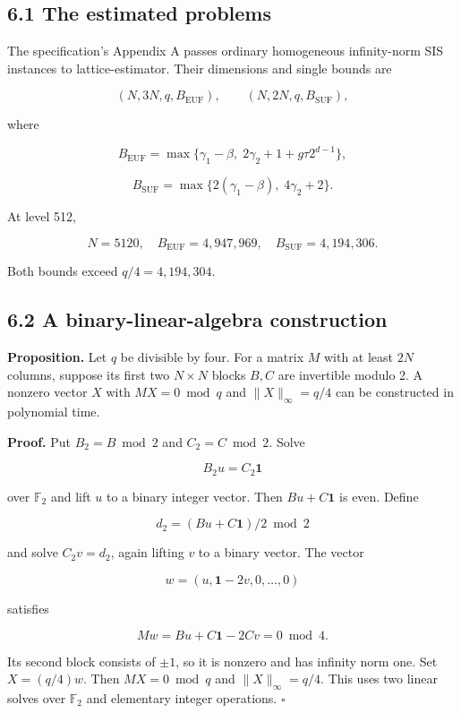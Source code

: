 \documentclass[
  american,
  10pt,
  a4paper,
]{article}
\begin{document}
\subsection{6.1 The estimated problems}\label{the-estimated-problems}

The specification's Appendix A passes ordinary homogeneous infinity-norm
SIS instances to lattice-estimator. Their dimensions and single bounds
are

\[
(N,3N,q,B_{\mathrm{EUF}}),\qquad (N,2N,q,B_{\mathrm{SUF}}),
\]

where

\[
B_{\mathrm{EUF}}=\max\{\gamma_1-\beta,\;2\gamma_2+1+g\tau 2^{d-1}\},
\]

\[
B_{\mathrm{SUF}}=\max\{2(\gamma_1-\beta),\;4\gamma_2+2\}.
\]

At level 512,

\[
N=5120,\quad B_{\mathrm{EUF}}=4,947,969,\quad
B_{\mathrm{SUF}}=4,194,306.
\]

Both bounds exceed \(q/4=4,194,304\).

\subsection{6.2 A binary-linear-algebra
construction}\label{a-binary-linear-algebra-construction}

\textbf{Proposition.} Let \(q\) be divisible by four. For a matrix \(M\)
with at least \(2N\) columns, suppose its first two \(N\times N\) blocks
\(B,C\) are invertible modulo 2. A nonzero vector \(X\) with
\(MX=0\bmod q\) and \(\|X\|_\infty=q/4\) can be constructed in
polynomial time.

\textbf{Proof.} Put \(B_2=B\bmod2\) and \(C_2=C\bmod2\). Solve

\[
B_2u=C_2\mathbf 1
\]

over \(\mathbb F_2\) and lift \(u\) to a binary integer vector. Then
\(Bu+C\mathbf1\) is even. Define

\[
d_2=(Bu+C\mathbf1)/2\bmod2
\]

and solve \(C_2v=d_2\), again lifting \(v\) to a binary vector. The
vector

\[
w=(u,\mathbf1-2v,0,\ldots,0)
\]

satisfies

\[
Mw=Bu+C\mathbf1-2Cv=0\bmod4.
\]

Its second block consists of \(\pm1\), so it is nonzero and has infinity
norm one. Set \(X=(q/4)w\). Then \(MX=0\bmod q\) and
\(\|X\|_\infty=q/4\). This uses two linear solves over \(\mathbb F_2\)
and elementary integer operations. \(\square\)
\end{document}

